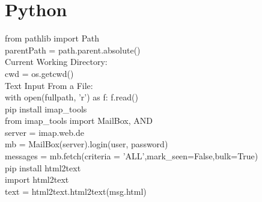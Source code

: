 \chapter{Python}\label{chap:Python}
from pathlib import Path\\
parentPath = path.parent.absolute()\\
Current Working Directory:\\
cwd = os.getcwd()\\
Text Input From a File:\\
with open(fullpath, 'r') as f:
f.read()\\


pip install imap\_tools\\
from imap\_tools import MailBox, AND\\
server = imap.web.de\\
mb = MailBox(server).login(user, password)\\
messages = mb.fetch(criteria = 'ALL',mark_seen=False,bulk=True)\\
pip install html2text\\
import html2text\\
text = html2text.html2text(msg.html)\\